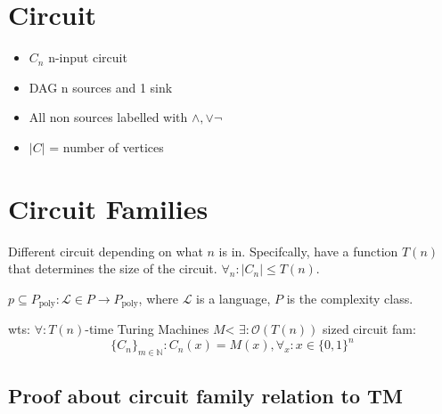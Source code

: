 \documentclass[11pt]{article} %
\begin{document}
\centerline{\LARGE\thishw}

\section{Circuit}

\begin{itemize}
\item $C_n$ n-input circuit
\item DAG n sources and 1 sink
\item All non sources labelled with $\wedge, \vee \neg$
\item $|C|$ = number of vertices
\end{itemize}

\section{Circuit Families}

Different circuit depending on what $n$ is in. Specifcally, have a function $T(n)$ that determines the size of the circuit. $\forall_n : |C_n| \leq T(n)$.




 $p \subseteq P_{\text{poly}}: \mathcal{L} \in P \rightarrow P_{\text{poly}}$, where $\mathcal{L}$ is a language, $P$ is the complexity class.

wts: $\forall : T(n)$-time Turing Machines $M$< $\exists : \mathcal{O}(T(n))$ sized circuit fam:
\begin{equation*}
\{C_n\}_{m \in \mathbb{N}} : C_n(x) = M(x), \forall_x : x \in \{0,1\}^n
\end{equation*}


\subsection{Proof about circuit family relation to TM}
\end{document}
